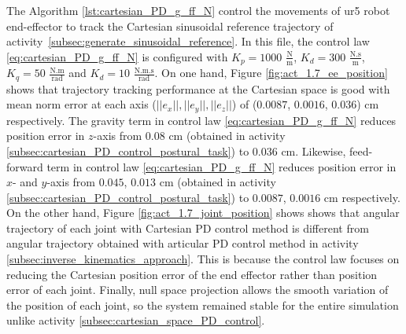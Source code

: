 The Algorithm \ref{lst:cartesian_PD_g_ff_N} control the movements of ur5 robot end-effector to track the Cartesian sinusoidal reference trajectory of activity~\ref{subsec:generate_sinusoidal_reference}. In this file, the control law \eqref{eq:cartesian_PD_g_ff_N} is configured with ${K_{p}}=1000$ $\mathrm{\frac{N}{m}}$, $K_{d}= 300$ $\mathrm{\frac{N.s}{m}}$, ${K_{q}}=50$ $\mathrm{\frac{N.m}{rad}}$ and $K_{d}= 10$ $\mathrm{\frac{N.m.s}{rad}}$. On one hand, Figure \ref{fig:act_1.7_ee_position} shows that trajectory tracking performance at the Cartesian space is good with mean norm error at each axis ($||e_x||, ||e_y||, ||e_z||$) of ($0.0087$, $0.0016$, $0.036$) cm respectively. The gravity term in control law \eqref{eq:cartesian_PD_g_ff_N} reduces position error in $z$-axis from $0.08$ cm (obtained in activity \ref{subsec:cartesian_PD_control_postural_task}) to $0.036$ cm. Likewise, feed-forward term in control law \eqref{eq:cartesian_PD_g_ff_N} reduces position error in $x$- and $y$-axis from $0.045$, $0.013$ cm (obtained in activity \ref{subsec:cartesian_PD_control_postural_task}) to $0.0087$, $0.0016$ cm respectively. On the other hand, Figure \ref{fig:act_1.7_joint_position} shows shows that angular trajectory of each joint with Cartesian PD control method is different from angular trajectory obtained with articular PD control method in activity \ref{subsec:inverse_kinematics_approach}. This is because the control law focuses on reducing the Cartesian position error of the end effector rather than position error of each joint. Finally, null space projection allows the smooth variation of the position of each joint, so the system remained stable for the entire simulation unlike activity \ref{subsec:cartesian_space_PD_control}. \vspace{.5cm}

